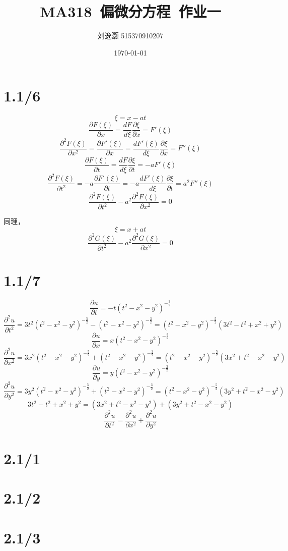 \documentclass{article}
\title{MA318\ 偏微分方程\ 作业一}
\author{刘逸灏 515370910207}
\date{\today}
\begin{document}
\maketitle

\section{1.1/6}
$$\xi=x-at$$
$$\frac{\partial F(\xi)}{\partial x}=\frac{dF}{d\xi}\frac{\partial\xi}{\partial x}=F'(\xi)$$
$$\frac{\partial^2 F(\xi)}{\partial x^2}=\frac{\partial F'(\xi)}{\partial x}=\frac{dF'(\xi)}{d\xi}\frac{\partial\xi}{\partial x}=F''(\xi)$$
$$\frac{\partial F(\xi)}{\partial t}=\frac{dF}{d\xi}\frac{\partial\xi}{\partial t}=-aF'(\xi)$$
$$\frac{\partial^2 F(\xi)}{\partial t^2}=-a\frac{\partial F'(\xi)}{\partial t}=-a\frac{dF'(\xi)}{d\xi}\frac{\partial\xi}{\partial t}=a^2F''(\xi)$$
$$\frac{\partial^2 F(\xi)}{\partial t^2}-a^2\frac{\partial^2 F(\xi)}{\partial x^2}=0$$

同理，
$$\xi=x+at$$
$$\frac{\partial^2 G(\xi)}{\partial t^2}-a^2\frac{\partial^2 G(\xi)}{\partial x^2}=0$$

\section{1.1/7}
$$\frac{\partial u}{\partial t}=-t(t^2-x^2-y^2)^{-\frac{3}{2}}$$
$$\frac{\partial^2 u}{\partial t^2}=3t^2(t^2-x^2-y^2)^{-\frac{5}{2}}-(t^2-x^2-y^2)^{-\frac{3}{2}}=(t^2-x^2-y^2)^{-\frac{5}{2}}(3t^2-t^2+x^2+y^2)$$
$$\frac{\partial u}{\partial x}=x(t^2-x^2-y^2)^{-\frac{3}{2}}$$
$$\frac{\partial^2 u}{\partial x^2}=3x^2(t^2-x^2-y^2)^{-\frac{5}{2}}+(t^2-x^2-y^2)^{-\frac{3}{2}}=(t^2-x^2-y^2)^{-\frac{5}{2}}(3x^2+t^2-x^2-y^2)$$
$$\frac{\partial u}{\partial y}=y(t^2-x^2-y^2)^{-\frac{3}{2}}$$
$$\frac{\partial^2 u}{\partial y^2}=3y^2(t^2-x^2-y^2)^{-\frac{5}{2}}+(t^2-x^2-y^2)^{-\frac{3}{2}}=(t^2-x^2-y^2)^{-\frac{5}{2}}(3y^2+t^2-x^2-y^2)$$
$$3t^2-t^2+x^2+y^2=(3x^2+t^2-x^2-y^2)+(3y^2+t^2-x^2-y^2)$$
$$\frac{\partial^2 u}{\partial t^2}=\frac{\partial^2 u}{\partial x^2}+\frac{\partial^2 u}{\partial y^2}$$

\section{2.1/1}

\section{2.1/2}

\section{2.1/3}
\end{document}
